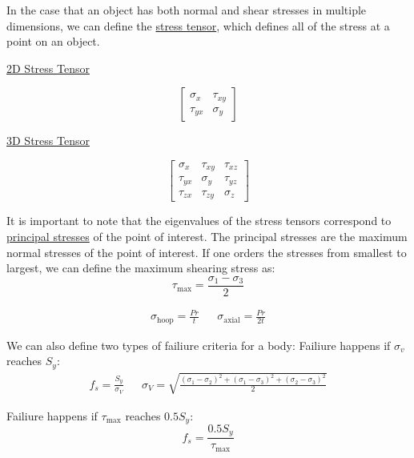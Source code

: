 \documentclass{article}
\begin{document}

In the case that an object has both normal and shear stresses in multiple dimensions,
we can define the \underline{stress tensor}, which defines all of the stress at a point
on an object.

\begin{multicols}{2}
    \begin{center}\underline{2D Stress Tensor}\end{center}
    \[
        \begin{bmatrix}
            \sigma_x & \tau_{xy}\\
            \tau_{yx} & \sigma_y
        \end{bmatrix}    
    \]
    \vfill\null\columnbreak
    \begin{center}\underline{3D Stress Tensor}\end{center}
    \[
        \begin{bmatrix}
            \sigma_x & \tau_{xy} & \tau_{xz}\\
            \tau_{yx} & \sigma_y & \tau_{yz}\\
            \tau_{zx} & \tau_{zy} & \sigma_z
        \end{bmatrix}    
    \]
\end{multicols}
It is important to note that the eigenvalues of the stress tensors correspond to 
\underline{principal stresses} of the point of interest. The principal stresses
are the maximum normal stresses of the point of interest. 
\gap
If one orders the stresses from smallest to largest, we can define the maximum shearing
stress as:
\[
    \tau_\textrm{max} = \frac{\sigma_1 - \sigma_3}{2}
\]


\begin{align*}
    \sigma_\textrm{hoop} = \frac{Pr}{t} && \sigma_\textrm{axial} = \frac{Pr}{2t}
\end{align*}

\pagebreak

We can also define two types of failiure criteria for a body:
\gap
{} Failiure happens if $\sigma_v$ reaches $S_y$:
\begin{align*}
    f_s = \frac{S_y}{\sigma_V} && \sigma_V = \sqrt{\frac{(\sigma_1 - \sigma_2)^2 + (\sigma_1 - \sigma_3)^2 + (\sigma_2 - \sigma_3)^2}{2}} 
\end{align*}

 Failiure happens if $\tau_\textrm{max}$ reaches $0.5S_y$:
\[
    f_s = \frac{0.5S_y}{\tau_\textrm{max}}    
\]
\end{document}
